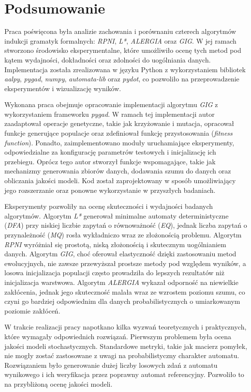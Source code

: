 \chapter{Podsumowanie}
\label{cha:podsumowanie}  

Praca poświęcona była analizie zachowania i porównaniu czterech algorytmów indukcji gramatyk formalnych: \textit{RPNI}, \textit{L*}, \textit{ALERGIA} oraz \textit{GIG}. W jej ramach stworzono środowisko eksperymentalne, które umożliwiło ocenę tych metod pod kątem wydajności, dokładności oraz zdolności do uogólniania danych. Implementacja została zrealizowana w języku Python z wykorzystaniem bibliotek \textit{aalpy}, \textit{pygad}, \textit{numpy}, \textit{automata-lib} oraz \textit{pydot}, co pozwoliło na przeprowadzenie eksperymentów i wizualizację wyników.

Wykonana praca obejmuje opracowanie implementacji algorytmu \textit{GIG} z wykorzystaniem frameworku \textit{pygad}. W ramach tej implementacji autor zaadaptował operacje genetyczne, takie jak krzyżowanie i mutacja, opracował funkcje generujące populacje oraz zdefiniował funkcję przystosowania (\textit{fitness function}). Ponadto, zaimplementowano moduły uruchamiające eksperymenty, odpowiedzialne za konfigurację parametrów testowych i inicjalizację ich przebiegu. Oprócz tego autor stworzył funkcje wspomagające, takie jak mechanizmy generowania zbiorów danych, dodawania szumu do danych oraz obliczania jakości modeli. Kod został zaprojektowany w sposób umożliwiający jego rozszerzanie oraz ponowne wykorzystanie w przyszłych badaniach.  

Eksperymenty pozwoliły na ocenę skuteczności i wydajności badanych algorytmów. Algorytm \textit{L*} generował minimalne automaty deterministyczne (\textit{DFA}) przy niskiej liczbie zapytań o równoważność (\textit{EQ}), jednak liczba zapytań o przynależność (\textit{MQ}) rosła wykładniczo wraz ze złożonością problemu. Algorytm \textit{RPNI} wyróżniał się prostotą, niską złożonością i skutecznym uogólnianiem danych. Algorytm \textit{GIG}, choć oferował elastyczność dzięki zastosowaniu metod ewolucyjnych, nie zawsze przewyższał prostsze metody pod względem wyników, a losowa inicjalizacja populacji często prowadziła do lepszych rezultatów niż inicjalizacja warstwowa. Algorytm \textit{ALERGIA} wykazał odporność na niewielkie zakłócenia, jednak jego skuteczność malała wraz ze wzrostem poziomu szumu, co czyni go bardziej odpowiednim dla danych probabilistycznych o umiarkowanym poziomie zakłóceń.  

W trakcie realizacji pracy napotkano kilka wyzwań teoretycznych i praktycznych, które wymagały odpowiednich rozwiązań. Pierwszym problemem była ocena jakości modeli stochastycznych. Standardowe metryki, takie jak macierz pomyłek, nie mogły zostać zastosowane z uwagi na probabilistyczny charakter automatu. Rozwiązaniem było generowanie dużej liczby losowych zdań z automatu wynikowego i ich weryfikacja przez poprawny automat referencyjny. Pozwoliło to na przybliżoną ocenę jakości modeli.

